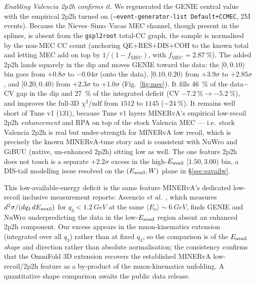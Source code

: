 \emph{Enabling Valencia 2p2h confirms it.} We regenerated the GENIE central
value with the empirical 2p2h turned on (\texttt{--event-generator-list
Default+CCMEC}, 2M events). Because the Nieves--Simo--Vacas MEC channel, though
present in the splines, is absent from the \texttt{gspl2root} total-CC graph, the
sample is normalised by the non-MEC CC count (anchoring QE$+$RES$+$DIS$+$COH to
the known total and letting MEC add on top by $1/(1-f_{\mathrm{MEC}})$, with
$f_{\mathrm{MEC}}=\SI{2.87}{\percent}$). The added 2p2h lands squarely in the dip
and moves GENIE toward the data: the $[0,0.10)$ bin goes from $+0.8\sigma$ to
$-0.04\sigma$ (onto the data), $[0.10,0.20)$ from $+3.9\sigma$ to $+2.85\sigma$,
and $[0.20,0.40)$ from $+2.3\sigma$ to $+1.0\sigma$ (Fig.~\ref{fig:mec}). It
fills \SI{46}{\percent} of the data$-$CV gap in the dip and \SI{27}{\percent} of
the integrated deficit (CV $-\SI{7.2}{\percent}\to-\SI{5.2}{\percent}$), and
improves the full-3D $\chi^{2}/\mathrm{ndf}$ from $1512$ to $1145$
($-\SI{24}{\percent}$). It remains well short of Tune v1 ($131$), because Tune v1
layers MINERvA's empirical low-recoil 2p2h \emph{enhancement} and RPA on top of
the stock Valencia MEC --- i.e.\ stock Valencia 2p2h is real but under-strength
for MINERvA low recoil, which is precisely the known MINERvA-tune story and is
consistent with NuWro and GiBUU (native, un-enhanced 2p2h) sitting low as well.
The one feature 2p2h does not touch is a separate $+2.2\sigma$ excess in the
high-$E_{\mathrm{avail}}$ $[1.50,3.00)$ bin, a DIS-tail modelling issue resolved on the
$(E_{\mathrm{avail}},W)$ plane in \S\ref{sec:eavailw}.

This low-available-energy deficit is the same feature MINERvA's dedicated low-recoil
inclusive measurement reports: Ascencio \emph{et al.}~\cite{MINERvA:2022incl}, which
measures $d^{2}\sigma/(dq_{3}\,dE_{\mathrm{avail}})$ for $q_{3}<\SI{1.2}{GeV}$ at the same
$\langle E_\nu\rangle\sim\SI{6}{GeV}$, finds GENIE and NuWro underpredicting the data in
the low-$E_{\mathrm{avail}}$ region absent an enhanced 2p2h component. Our excess appears in the
muon-kinematics extension (integrated over all $q_3$) rather than at fixed $q_3$, so the
comparison is of the $E_{\mathrm{avail}}$ \emph{shape} and direction rather than absolute
normalisation; the consistency confirms that the OmniFold 3D extension recovers the
established MINERvA low-recoil/2p2h feature as a by-product of the muon-kinematics
unfolding. A quantitative
shape comparison awaits the public \cite{MINERvA:2022incl} data release.

